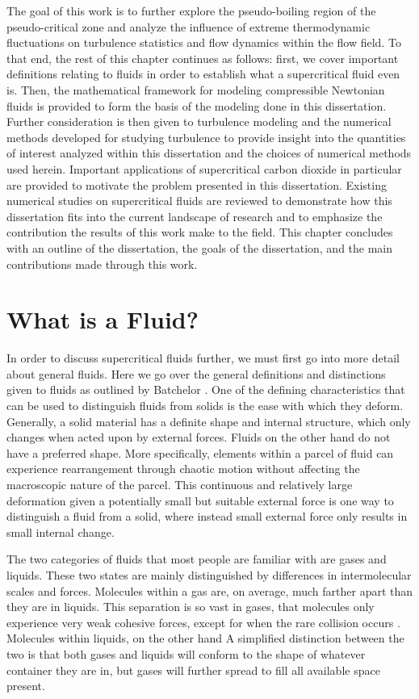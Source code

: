 The goal of this work is to further explore the pseudo-boiling region of the pseudo-critical zone and analyze the influence of extreme thermodynamic fluctuations on turbulence statistics and flow dynamics within the flow field. To that end, the rest of this chapter continues as follows: first, we cover important definitions relating to fluids in order to establish what a supercritical fluid even is. Then, the mathematical framework for modeling compressible Newtonian fluids is provided to form the basis of the modeling done in this dissertation. Further consideration is then given to turbulence modeling and the numerical methods developed for studying turbulence to provide insight into the quantities of interest analyzed within this dissertation and the choices of numerical methods used herein. Important applications of supercritical carbon dioxide in particular are provided to motivate the problem presented in this dissertation. Existing numerical studies on supercritical fluids are reviewed to demonstrate how this dissertation fits into the current landscape of research and to emphasize the contribution the results of this work make to the field. This chapter concludes with an outline of the dissertation, the goals of the dissertation, and the main contributions made through this work. 

\section{What is a Fluid?} 

In order to discuss supercritical fluids further, we must first go into more detail about general fluids. Here we go over the general definitions and distinctions given to fluids as outlined by Batchelor \cite{batchelor_2000}. One of the defining characteristics that can be used to distinguish fluids from solids is the ease with which they deform. Generally, a solid material has a definite shape and internal structure, which only changes when acted upon by external forces. Fluids on the other hand do not have a preferred shape. More specifically, elements within a parcel of fluid can experience rearrangement through chaotic motion without affecting the macroscopic nature of the parcel. This continuous and relatively large deformation given a potentially small but suitable external force is one way to distinguish a fluid from a solid, where instead small external force only results in small internal change. 

The two categories of fluids that most people are familiar with are gases and liquids. These two states are mainly distinguished by differences in intermolecular scales and forces. Molecules within a gas are, on average, much farther apart than they are in liquids. This separation is so vast in gases, that molecules only experience very weak cohesive forces, except for when the rare collision occurs \cite{batchelor_2000}. Molecules within liquids, on the other hand A simplified distinction between the two is that both gases and liquids will conform to the shape of whatever container they are in, but gases will further spread to fill all available space present. 

